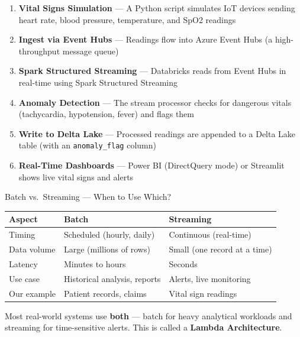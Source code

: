 \documentclass[12pt, a4paper, oneside]{report}
\begin{document}
\begin{enumerate}[label=\textcolor{accent}{\textbf{Step \arabic*:}}]
    \item \textbf{Vital Signs Simulation} --- A Python script simulates IoT devices sending heart rate, blood pressure, temperature, and SpO2 readings
    \item \textbf{Ingest via Event Hubs} --- Readings flow into Azure Event Hubs (a high-throughput message queue)
    \item \textbf{Spark Structured Streaming} --- Databricks reads from Event Hubs in real-time using Spark Structured Streaming
    \item \textbf{Anomaly Detection} --- The stream processor checks for dangerous vitals (tachycardia, hypotension, fever) and flags them
    \item \textbf{Write to Delta Lake} --- Processed readings are appended to a Delta Lake table (with an \texttt{anomaly\_flag} column)
    \item \textbf{Real-Time Dashboards} --- Power BI (DirectQuery mode) or Streamlit shows live vital signs and alerts
\end{enumerate}

\begin{conceptbox}{Batch vs.\ Streaming --- When to Use Which?}
\begin{center}
\small
\begin{tabular}{p{3cm} p{5cm} p{5cm}}
    \toprule
    \textbf{Aspect} & \textbf{Batch} & \textbf{Streaming} \\
    \midrule
    Timing & Scheduled (hourly, daily) & Continuous (real-time) \\
    Data volume & Large (millions of rows) & Small (one record at a time) \\
    Latency & Minutes to hours & Seconds \\
    Use case & Historical analysis, reports & Alerts, live monitoring \\
    Our example & Patient records, claims & Vital sign readings \\
    \bottomrule
\end{tabular}
\end{center}
Most real-world systems use \textbf{both} --- batch for heavy analytical workloads and streaming for time-sensitive alerts. This is called a \textbf{Lambda Architecture}.
\end{conceptbox}
\end{document}
